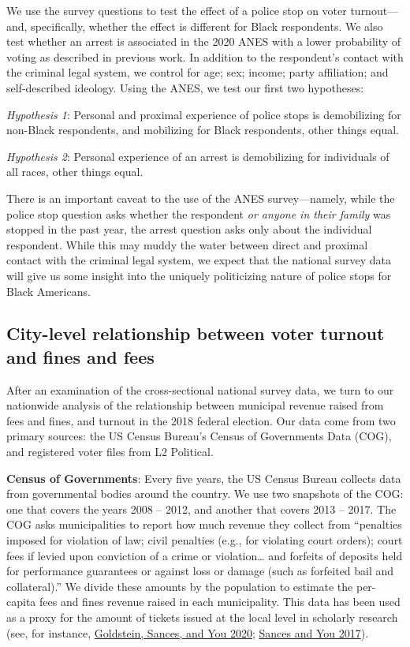 \documentclass[
  12pt,
]{article}
\begin{document}
We use the survey questions to test the effect of a police stop on voter turnout---and, specifically, whether the effect is different for Black respondents. We also test whether an arrest is associated in the 2020 ANES with a lower probability of voting as described in previous work. In addition to the respondent's contact with the criminal legal system, we control for age; sex; income; party affiliation; and self-described ideology. Using the ANES, we test our first two hypotheses:

\emph{Hypothesis 1}: Personal and proximal experience of police stops is demobilizing for non-Black respondents, and mobilizing for Black respondents, other things equal.

\emph{Hypothesis 2}: Personal experience of an arrest is demobilizing for individuals of all races, other things equal.

There is an important caveat to the use of the ANES survey---namely, while the police stop question asks whether the respondent \emph{or anyone in their family} was stopped in the past year, the arrest question asks only about the individual respondent. While this may muddy the water between direct and proximal contact with the criminal legal system, we expect that the national survey data will give us some insight into the uniquely politicizing nature of police stops for Black Americans.

\hypertarget{city-level-relationship-between-voter-turnout-and-fines-and-fees}{%
\subsection*{City-level relationship between voter turnout and fines and fees}\label{city-level-relationship-between-voter-turnout-and-fines-and-fees}}

After an examination of the cross-sectional national survey data, we turn to our nationwide analysis of the relationship between municipal revenue raised from fees and fines, and turnout in the 2018 federal election. Our data come from two primary sources: the US Census Bureau's Census of Governments Data (COG), and registered voter files from L2 Political.

\textbf{Census of Governments}: Every five years, the US Census Bureau collects data from governmental bodies around the country. We use two snapshots of the COG: one that covers the years 2008 -- 2012, and another that covers 2013 -- 2017. The COG asks municipalities to report how much revenue they collect from ``penalties imposed for violation of law; civil penalties (e.g., for violating court orders); court fees if levied upon conviction of a crime or violation\ldots{} and forfeits of deposits held for performance guarantees or against loss or damage (such as forfeited bail and collateral).'' We divide these amounts by the population to estimate the per-capita fees and fines revenue raised in each municipality. This data has been used as a proxy for the amount of tickets issued at the local level in scholarly research (see, for instance, \protect\hyperlink{ref-Goldstein2020}{Goldstein, Sances, and You 2020}; \protect\hyperlink{ref-Sances2017}{Sances and You 2017}).
\end{document}
